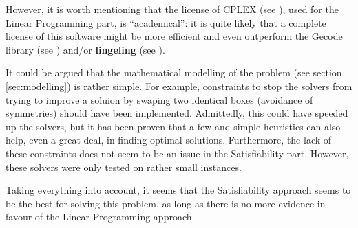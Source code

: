 \hfill

However, it is worth mentioning that the license of CPLEX (see \cite{CplexWEB}), used for the
Linear Programming part, is ``academical'': it is quite likely that a complete license
of this software might be more efficient and even outperform the Gecode library (see
\cite{GecodeWEB}) and/or \textbf{lingeling} (see \cite{lingeling}).

\hfill

It could be argued that the mathematical modelling of the problem (see section
\ref{sec:modelling}) is rather simple. For example, constraints to stop the solvers from
trying to improve a soluion by swaping two identical boxes (avoidance of symmetries) should
have been implemented. Admittedly, this could have speeded up the solvers, but it has been
proven that a few and simple heuristics can also help, even a great deal, in finding optimal
solutions. Furthermore, the lack of these constraints does not seem to be an issue in the
Satisfiability part. However, these solvers were only tested on rather small instances.

\hfill

Taking everything into account, it seems that the Satisfiability approach seems to be the
best for solving this problem, as long as there is no more evidence in favour of the
Linear Programming approach.




